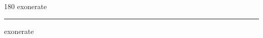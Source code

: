 
\begin{frame}
\begin{center}
\begin{turn}{180}
{\fontsize{2.5cm}{1em}\selectfont exonerate}
\end{turn}
\vspace{1em}\par  
\hrule
\vspace{1em}\par  
{\fontsize{2.5cm}{1em}\selectfont exonerate}
\end{center}
\end{frame}
